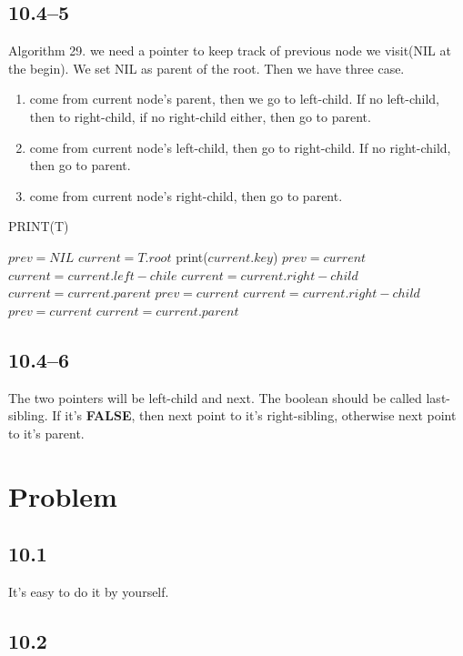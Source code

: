 \documentclass{article}
\begin{document}
\subsection*{10.4--5}
Algorithm 29. we need a pointer to keep track of previous node we visit(NIL at the begin). We set NIL as parent of the root. Then we have three case.
\begin{enumerate}
\item come from current node's parent, then we go to left-child. If no left-child, then to right-child, if no right-child either, then go to parent.
\item come from current node's left-child, then go to right-child. If no right-child, then go to parent.
\item come from current node's right-child, then go to parent.
\end{enumerate}
\begin{algorithm}
  \caption{PRINT(T)}
  \begin{algorithmic}[1]
    \STATE $prev = NIL$
    \STATE $current = T.root$
    \STATE print($current.key$)
    \STATE $prev = current$
    \STATE $current = current.left-chile$
    \STATE $current = current.right-child$
    \ELSE
    \STATE $current = current.parent$
    \ENDIF
    \STATE $prev = current$
    \STATE $current = current.right-child$
    \ELSE
    \STATE $prev = current$
    \STATE $current = current.parent$
    \ENDIF
    \ENDWHILE
  \end{algorithmic}
\end{algorithm}

\subsection*{10.4--6}
The two pointers will be left-child and next. The boolean should be called last-sibling. If it's \textbf{FALSE}, then next point to it's right-sibling, otherwise next point to it's parent.

\section*{Problem}
\subsection*{10.1}
It's easy to do it by yourself.

\subsection*{10.2}
\end{document}
